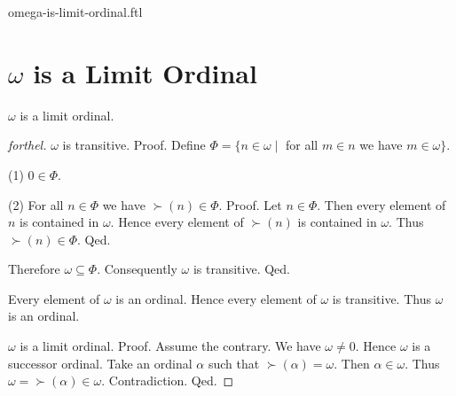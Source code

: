 \documentclass{naproche-library}
\begin{document}
\begin{smodule}{omega-is-limit-ordinal.ftl}

  \section*{$\omega$ is a Limit Ordinal}

  \begin{proposition}[forthel,id=SET_THEORY_03_764451995254784]
    $\omega$ is a limit ordinal.
  \end{proposition}
  \begin{proof}[forthel]
    $\omega$ is transitive. \newline
    Proof.
      Define $\Phi = \{ n \in \omega \mid$ for all $m \in n$ we have $m \in \omega \}$.

      (1) $0 \in \Phi$.

      (2) For all $n \in \Phi$ we have $\succ(n) \in \Phi$. \newline
      Proof.
        Let $n \in \Phi$.
        Then every element of $n$ is contained in $\omega$.
        Hence every element of $\succ(n)$ is contained in $\omega$.
        Thus $\succ(n) \in \Phi$.
      Qed.

      Therefore $\omega \subseteq \Phi$.
      Consequently $\omega$ is transitive.
    Qed.

    Every element of $\omega$ is an ordinal.
    Hence every element of $\omega$ is transitive.
    Thus $\omega$ is an ordinal.

    $\omega$ is a limit ordinal. \newline
    Proof.
      Assume the contrary.
      We have $\omega \neq 0$.
      Hence $\omega$ is a successor ordinal.
      Take an ordinal $\alpha$ such that $\succ(\alpha) = \omega$.
      Then $\alpha \in \omega$.
      Thus $\omega = \succ(\alpha) \in \omega$.
      Contradiction.
    Qed.
  \end{proof}
\end{smodule}
\end{document}
